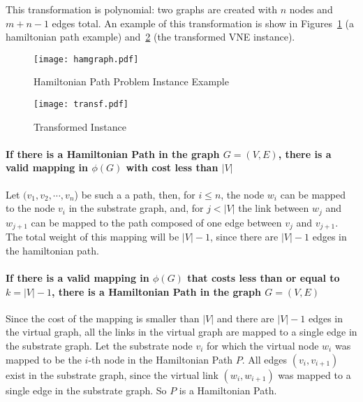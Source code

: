 This transformation is polynomial: two graphs are created with $n$ nodes and $m + n - 1$ edges total. An example of this transformation is show in Figures~\ref{fig:ham} (a hamiltonian path example) and~\ref{fig:hamtrans} (the transformed VNE instance).

\begin{figure}[h]
  \centering
  \texttt{[image: hamgraph.pdf]}
  \caption{Hamiltonian Path Problem Instance Example}\label{fig:ham}
\end{figure}

\begin{figure}[h]
  \centering
  \texttt{[image: transf.pdf]}
  \caption{Transformed Instance}\label{fig:hamtrans}
\end{figure}


\paragraph{If there is a Hamiltonian Path in the graph $G=(V,E)$, there is a valid mapping in $\phi(G)$ with cost less than $|V|$}
Let $(v_{1},v_{2},\cdots,v_{n}$) be such a a path, then, for $i \leq n$, the node $w_{i}$ can be mapped to the node $v_{i}$ in the substrate graph, and, for $j < |V|$ the link between $w_{j}$ and $w_{j+1}$ can be mapped to the path composed of one edge between $v_{j}$ and $v_{j+1}$. The total weight of this mapping will be $|V|-1$, since there are $|V|-1$ edges in the hamiltonian path.

\paragraph{If there is a valid mapping in $\phi(G)$ that costs less than or equal to $k = |V| - 1$, there is a Hamiltonian Path in the graph $G=(V,E)$}
Since the cost of the mapping is smaller than $|V|$ and there are $|V|-1$ edges in the virtual graph, all the links in the virtual graph are mapped to a single edge in the substrate graph. Let the substrate node $v_{i}$ for which the virtual node $w_{i}$ was mapped to be the $i$-th node in the Hamiltonian Path $P$. All edges $(v_{i},v_{i+1})$ exist in the substrate graph, since the virtual link $(w_{i},w_{i+1})$ was mapped to a single edge in the substrate graph. So $P$ is a Hamiltonian Path.


